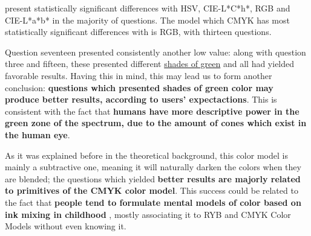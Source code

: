 present statistically significant differences with HSV, CIE-L*C*h*, RGB and CIE-L*a*b* in the majority of questions. The model which CMYK has most statistically significant differences with is RGB, with thirteen questions. \par
%
Question seventeen presented consistently another low value: along with question three and fifteen, these presented different \ul{shades of green} and all had yielded favorable results. Having this in mind, this may lead us to
form another conclusion: \textbf{questions which presented shades of green color may produce better results, according to users' expectactions}. This is consistent with the fact that \textbf{humans have more descriptive power
in the green zone of the spectrum, due to the amount of cones which exist in the human eye}. \par
%
As it was explained before in the theoretical background, this color model is mainly a subtractive one, meaning it will naturally darken the colors when they are blended; the questions which yielded \textbf{better results are majorly
related to primitives of the CMYK color model}. This success could be related to the fact that \textbf{people tend to formulate mental models of color based on ink mixing in childhood} \cite{Gossett2004}, mostly associating it to
\gls{RYB} and CMYK Color Models without even knowing it. \par
%
